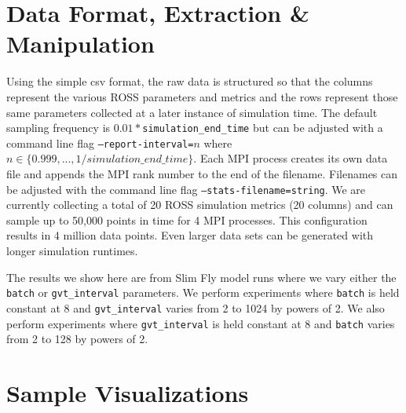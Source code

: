 \documentclass[12pt]{article}
\begin{document}
\section{Data Format, Extraction \& Manipulation} 

Using the simple csv format, the raw data is structured so that the columns represent the various ROSS parameters and metrics and the rows represent those same parameters collected at a later instance of simulation time. The default sampling frequency is $0.01*$\texttt{simulation\_end\_time} but can be adjusted with a command line flag \texttt{--report-interval=$n$} where $n\in \{0.999, ..., 1/simulation\_end\_time\}$. Each MPI process creates its own data file and appends the MPI rank number to the end of the filename. Filenames can be adjusted with the command line flag \texttt{--stats-filename=string}. We are currently collecting a total of 20 ROSS simulation metrics (20 columns) and can sample up to 50,000 points in time for 4 MPI processes. This configuration results in 4 million data points. Even larger data sets can be generated with longer simulation runtimes.

The results we show here are from Slim Fly model runs where we vary either the \texttt{batch} or \texttt{gvt\_interval} parameters.  We perform experiments where \texttt{batch} is held constant at 8 and \texttt{gvt\_interval} varies from 2 to 1024 by powers of 2.  We also perform experiments where \texttt{gvt\_interval} is held constant at 8 and \texttt{batch} varies from 2 to 128 by powers of 2.  


\section{Sample Visualizations}
\end{document}
